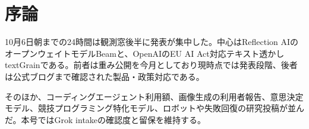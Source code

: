 \section*{序論}
10月6日朝までの24時間は観測窓後半に発表が集中した。中心はReflection AIのオープンウェイトモデルBeamと、OpenAIのEU AI Act対応テキスト透かしtextGrainである。前者は重み公開を今月としており現時点では発表段階、後者は公式ブログまで確認された製品・政策対応である。

そのほか、コーディングエージェント利用額、画像生成の利用者報告、意思決定モデル、競技プログラミング特化モデル、ロボットや失敗回復の研究投稿が並んだ。本号ではGrok intakeの確認度と留保を維持する。
